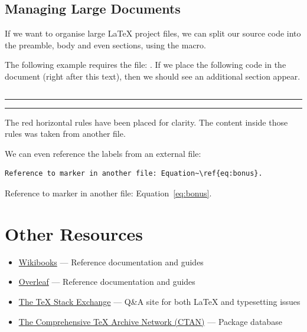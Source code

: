 \documentclass[11pt, twoside]{article}
\begin{document}
\subsection{Managing Large Documents}
If we want to organise large \LaTeX{} project files, we can split our source code into the preamble, body and even sections, using the \lstinline{} macro. %

The following example requires the file: .
If we place the following code in the document (right after this text), then we should see an additional section appear.
\begin{lstlisting}

\end{lstlisting}
{\color{red}\hrule}

{\color{red}\hrule}
The {\color{red} red} horizontal rules have been placed for clarity. The content inside those rules was taken from another file.

We can even reference the labels from an external file:
\begin{lstlisting}
Reference to marker in another file: Equation~\ref{eq:bonus}. 
\end{lstlisting}
Reference to marker in another file: Equation~\ref{eq:bonus}.
\section{Other Resources}
\begin{itemize}
    \item \href{https://en.wikibooks.org/wiki/LaTeX}{Wikibooks} --- Reference documentation and guides
    \item \href{https://www.overleaf.com/learn/latex/Tutorials}{Overleaf} --- Reference documentation and guides
    \item \href{https://tex.stackexchange.com/}{The \TeX{} Stack Exchange} --- Q\&A site for both \LaTeX{} and typesetting issues
    \item \href{https://ctan.org/}{The Comprehensive \TeX{} Archive Network (CTAN)} --- Package database
\end{itemize}
\newpage
\printbibliography
\end{document}
